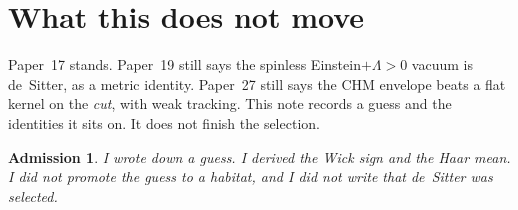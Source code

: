 \documentclass[11pt]{article}
\newtheorem*{admission}{Admission}
\begin{document}
\section{What this does not move}

Paper~17 stands. Paper~19 still says the spinless
Einstein$+\Lambda>0$ vacuum is de~Sitter, as a metric identity.
Paper~27 still says the CHM envelope beats a flat kernel on the
\emph{cut}, with weak tracking. This note records a guess and the identities it sits on.
It does not finish the selection.

\begin{admission}
I wrote down a guess. I derived the Wick sign and the Haar mean.
I did not promote the guess to a habitat, and I did not write
that de~Sitter was selected.
\end{admission}
\end{document}
